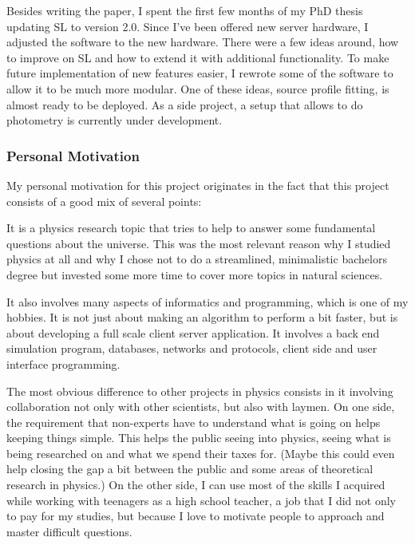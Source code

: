 \documentclass[11pt]{article}
\begin{document}
Besides writing the paper, I spent the first few months of my PhD thesis updating SL to version 2.0.
Since I've been offered new server hardware, I adjusted the software to the new hardware.
There were a few ideas around, how to improve on SL and how to extend it with additional functionality.
To make future implementation of new features easier, I rewrote some of the software to allow it to be much more modular.
One of these ideas, source profile fitting, is almost ready to be deployed.
As a side project, a setup that allows to do photometry is currently under development. 





\subsubsection{Personal Motivation}

My personal motivation for this project originates in the fact that this project consists of a good mix of several points:

It is a physics research topic that tries to help to answer some fundamental questions about the universe.
This was the most relevant reason why I studied physics at all and why I chose not to do a streamlined, minimalistic bachelors degree but invested some more time to cover more topics in natural sciences.

It also involves many aspects of informatics and programming, which is one of my hobbies.
It is not just about making an algorithm to perform a bit faster, but is about developing a full scale client server application. It involves a back end simulation program, databases, networks and protocols, client side and user interface programming.

The most obvious difference to other projects in physics consists in it involving collaboration not only with other scientists, but also with laymen.
On one side, the requirement that non-experts have to understand what is going on helps keeping things simple.
This helps the public seeing into physics, seeing what is being researched on and what we spend their taxes for.
(Maybe this could even help closing the gap a bit between the public and some areas of theoretical research in physics.)
On the other side, I can use most of the skills I acquired while working with teenagers as a high school teacher, a job that I did not only to pay for my studies, but because I love to motivate people to approach and master difficult questions.
\end{document}
